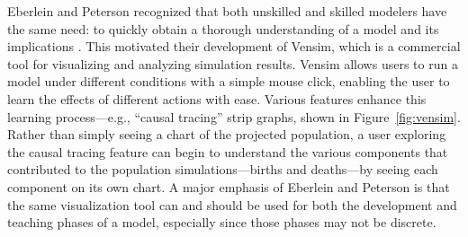 Eberlein and Peterson recognized that both unskilled and skilled modelers have the same need: to quickly obtain a thorough understanding of a model and its implications \cite{eberlein1992}.  This motivated their development of Vensim, which is a commercial tool for visualizing and analyzing simulation results.  Vensim allows users to run a model under different conditions with a simple mouse click, enabling the user to learn the effects of different actions with ease.  Various features enhance this learning process---e.g., ``causal tracing'' strip graphs, shown in Figure~\ref{fig:vensim}.  Rather than simply seeing a chart of the projected population, a user exploring the causal tracing feature can begin to understand the various components that contributed to the population simulations---births and deaths---by seeing each component on its own chart.  A major emphasis of Eberlein and Peterson is that the same visualization tool can and should be used for both the development and teaching phases of a model, especially since those phases may not be discrete.
